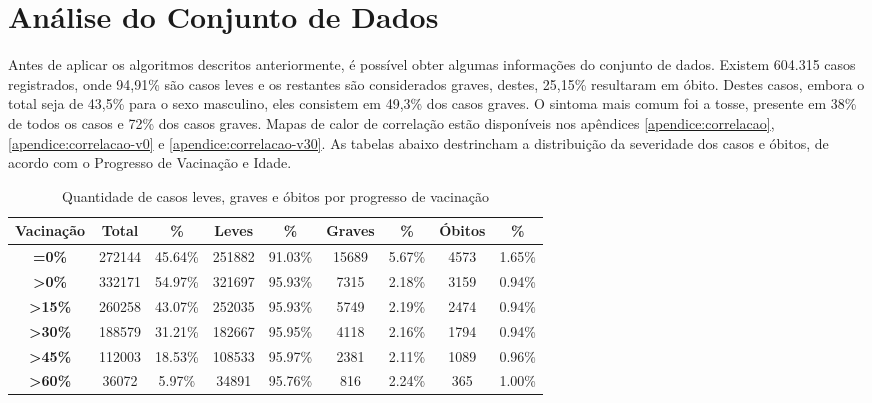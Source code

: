 \section{Análise do Conjunto de Dados}
\label{sec:geral}

Antes de aplicar os algoritmos descritos anteriormente, é possível obter algumas informações do conjunto de dados. Existem 604.315 casos registrados, onde 94,91\% são casos leves e os restantes são considerados graves, destes, 25,15\% resultaram em óbito. Destes casos, embora o total seja de 43,5\% para o sexo masculino, eles consistem em 49,3\% dos casos graves. O sintoma mais comum foi a tosse, presente em 38\% de todos os casos e 72\% dos casos graves. Mapas de calor de correlação estão disponíveis nos apêndices \ref{apendice:correlacao}, \ref{apendice:correlacao-v0} e \ref{apendice:correlacao-v30}. As tabelas abaixo destrincham a distribuição da severidade dos casos e óbitos, de acordo com o Progresso de Vacinação e Idade.


  \begin{table}[H]
    \centering
    \begin{tabular}{|c|c|c|c|c|c|c|c|c|}
    \hline
    \textbf{Vacinação}          & \textbf{Total} & \textbf{\%} & \textbf{Leves} & \textbf{\%} & \textbf{Graves} & \textbf{\%} & \textbf{Óbitos} & \textbf{\%} \\ \hline
    \textbf{=0\%}               & 272144         & 45.64\%           & 251882         & 91.03\%           & 15689           & 5.67\%             & 4573            & 1.65\%             \\ \hline
    \textbf{\textgreater{}0\%}  & 332171         & 54.97\%           & 321697         & 95.93\%           & 7315            & 2.18\%             & 3159            & 0.94\%             \\ \hline
    \textbf{\textgreater{}15\%} & 260258         & 43.07\%           & 252035         & 95.93\%           & 5749            & 2.19\%             & 2474            & 0.94\%             \\ \hline
    \textbf{\textgreater{}30\%} & 188579         & 31.21\%           & 182667         & 95.95\%           & 4118            & 2.16\%             & 1794            & 0.94\%             \\ \hline
    \textbf{\textgreater{}45\%} & 112003         & 18.53\%           & 108533         & 95.97\%           & 2381            & 2.11\%             & 1089            & 0.96\%             \\ \hline
    \textbf{\textgreater{}60\%} & 36072          & 5.97\%            & 34891          & 95.76\%           & 816             & 2.24\%             & 365             & 1.00\%             \\ \hline
    \end{tabular}
    \caption{Quantidade de casos leves, graves e óbitos por progresso de vacinação}
    \label{tbl:tabela-vacina-severidade}
    \end{table}
    
